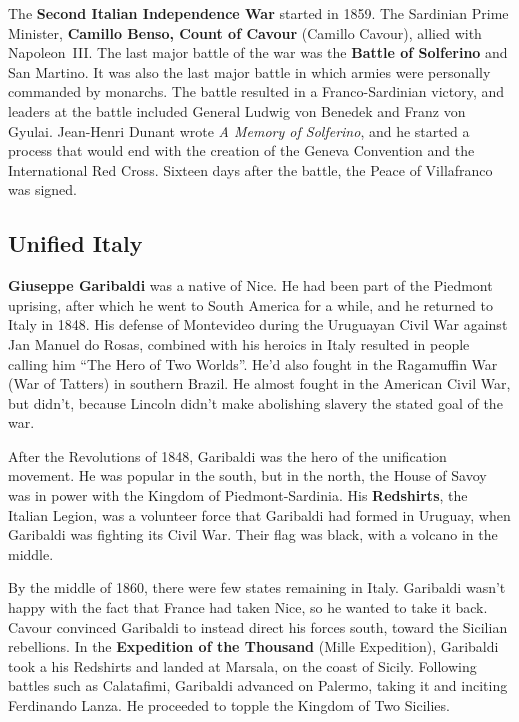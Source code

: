 The \textbf{Second Italian Independence War} started in 1859.
The Sardinian Prime Minister, \textbf{Camillo Benso, Count of Cavour} (Camillo Cavour), allied with Napoleon~III\@.
The last major battle of the war was the \textbf{Battle of Solferino} and San Martino.
It was also the last major battle in which armies were personally commanded by monarchs.
The battle resulted in a Franco-Sardinian victory,
and leaders at the battle included General Ludwig von Benedek and Franz von Gyulai.
Jean-Henri Dunant wrote \textit{A Memory of Solferino},
and he started a process that would end with the creation of the Geneva Convention and the International Red Cross.
Sixteen days after the battle, the Peace of Villafranco was signed.

\subsection*{Unified Italy}

\textbf{Giuseppe Garibaldi} was a native of Nice.
He had been part of the Piedmont uprising, after which he went to South America for a while,
and he returned to Italy in 1848.
His defense of Montevideo during the Uruguayan Civil War against Jan Manuel do Rosas,
combined with his heroics in Italy resulted in people calling him ``The Hero of Two Worlds''.
He'd also fought in the Ragamuffin War (War of Tatters) in southern Brazil.
He almost fought in the American Civil War, but didn't,
because Lincoln didn't make abolishing slavery the stated goal of the war.

After the Revolutions of 1848, Garibaldi was the hero of the unification movement.
He was popular in the south, but in the north, the House of Savoy was in power with the Kingdom of Piedmont-Sardinia.
His \textbf{Redshirts}, the Italian Legion, was a volunteer force that Garibaldi had formed in Uruguay,
when Garibaldi was fighting its Civil War.
Their flag was black, with a volcano in the middle.

By the middle of 1860, there were few states remaining in Italy.
Garibaldi wasn't happy with the fact that France had taken Nice, so he wanted to take it back.
Cavour convinced Garibaldi to instead direct his forces south, toward the Sicilian rebellions.
In the \textbf{Expedition of the Thousand} (Mille Expedition),
Garibaldi took a his Redshirts and landed at Marsala, on the coast of Sicily.
Following battles such as Calatafimi, Garibaldi advanced on Palermo, taking it and inciting Ferdinando Lanza.
He proceeded to topple the Kingdom of Two Sicilies.


